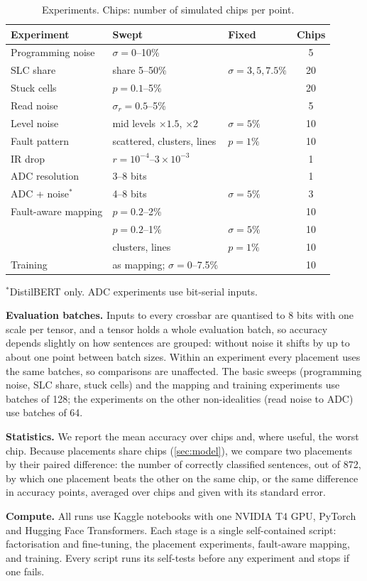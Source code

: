 \begin{table}[t]
\centering\footnotesize
\caption{Experiments. Chips: number of simulated chips per point.}\label{tab:experiments}
\setlength{\tabcolsep}{2.5pt}
\begin{tabular}{@{}lll c@{}}
\toprule
Experiment & Swept & Fixed & Chips \\
\midrule
Programming noise & $\sigma=0$--10\% & & 5 \\
SLC share & share 5--50\% & $\sigma=3,5,7.5\%$ & 20 \\
Stuck cells & $p=0.1$--5\% & & 20 \\
Read noise & $\sigma_r=0.5$--5\% & & 5 \\
Level noise & mid levels $\times1.5$, $\times2$ & $\sigma=5\%$ & 10 \\
Fault pattern & scattered, clusters, lines & $p=1\%$ & 10 \\
IR drop & $r=10^{-4}$--$3\times10^{-3}$ & & 1 \\
ADC resolution & 3--8 bits & & 1 \\
ADC + noise$^{*}$ & 4--8 bits & $\sigma=5\%$ & 3 \\
\midrule
Fault-aware mapping & $p=0.2$--2\% & & 10 \\
 & $p=0.2$--1\% & $\sigma=5\%$ & 10 \\
 & clusters, lines & $p=1\%$ & 10 \\
\midrule
Training & as mapping; $\sigma=0$--7.5\% & & 10 \\
\bottomrule
\end{tabular}

\smallskip
\raggedright$^{*}$DistilBERT only. ADC experiments use bit-serial inputs.
\end{table}

\textbf{Evaluation batches.} Inputs to every crossbar are quantised to 8 bits with one scale per tensor,
and a tensor holds a whole evaluation batch, so accuracy depends slightly on how sentences are grouped:
without noise it shifts by up to about one point between batch sizes. Within an experiment every
placement uses the same batches, so comparisons are unaffected. The basic sweeps (programming noise, SLC
share, stuck cells) and the mapping and training experiments use batches of 128; the experiments on
the other non-idealities (read noise to ADC) use batches of 64.

\textbf{Statistics.} We report the mean accuracy over chips and, where useful, the worst chip. Because
placements share chips (\cref{sec:model}), we compare two placements by their paired difference: the
number of correctly classified sentences, out of 872, by which one placement beats the other on the same
chip, or the same difference in accuracy points, averaged over chips and given with its standard error.

\textbf{Compute.} All runs use Kaggle notebooks with one NVIDIA T4 GPU, PyTorch and Hugging Face
Transformers. Each stage is a single self-contained script: factorisation and fine-tuning, the
placement experiments, fault-aware mapping, and training. Every script runs its self-tests before any
experiment and stops if one fails.

